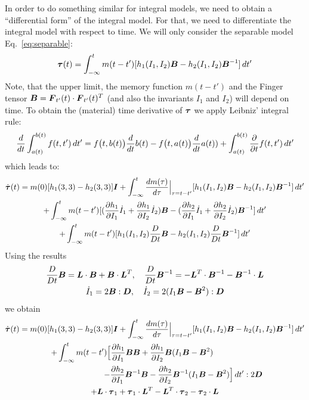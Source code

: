 In order to do something similar for integral models, we need to obtain a ``differential form'' of the integral model. For that, we need to differentiate the integral model with respect to time. We will only consider the separable model Eq.~\eqref{eq:separable}:
\begin{equation}
  \boldsymbol{\tau}(t) = \int_{-\infty}^tm(t-t')[h_1(I_1,I_2)\boldsymbol{B}-h_2(I_1,I_2)\boldsymbol{B}^{-1}]\,dt'
  \label{eq:separable2}
\end{equation}
Note, that the upper limit, the memory function $m(t-t')$ and the Finger tensor $\boldsymbol{B}=\boldsymbol{F}_{t'}(t)\cdot\boldsymbol{F}_{t'}(t)^T$  (and also the invariants $I_1$ and $I_2$) will depend on time. To obtain the (material) time derivative of $\boldsymbol{\tau}$ we apply Leibniz' integral rule:
\begin{equation}
    \dfrac{d }{d t}\int^{b(t)}_{a(t)}f(t,t')\,dt'=f\big(t,b(t)\big)\dfrac{d }{d t}b(t) -f\big(t,a(t)\big)\dfrac{d }{d t}a(t))+\int^{b(t)}_{a(t)}\dfrac{\partial }{\partial t}f(t,t')\,dt'
\end{equation}
which leads to:
\begin{multline}
  \dot{\boldsymbol{\tau}}(t) = m(0)[h_1(3,3)-h_2(3,3)]\boldsymbol{I}
  +\int_{-\infty}^t\dfrac{d m(\tau)}{d \tau}\Big|_{\tau=t-t'}[h_1(I_1,I_2)\boldsymbol{B}-h_2(I_1,I_2)\boldsymbol{B}^{-1}]\,dt'\\
  +\int_{-\infty}^tm(t-t')[(\dfrac{\partial h_1}{\partial I_1}\dot I_1+\dfrac{\partial h_1}{\partial I_2}\dot I_2)\boldsymbol{B}-
            (\dfrac{\partial h_2}{\partial I_1}\dot I_1+\dfrac{\partial h_2}{\partial I_2}\dot I_2)\boldsymbol{B}^{-1}]\,dt'\\
            +\int_{-\infty}^tm(t-t')[h_1(I_1,I_2)\dfrac{D }{D t}\boldsymbol{B}-h_2(I_1,I_2)\dfrac{D }{D t}\boldsymbol{B}^{-1}]\,dt'
  \label{eq:diffseparable}
\end{multline}
Using the results
\begin{gather}
  \dfrac{D }{D t}\boldsymbol{B} = \boldsymbol{L}\cdot \boldsymbol{B}+\boldsymbol{B} \cdot\boldsymbol{L}^T,\quad
    \dfrac{D }{D t}\boldsymbol{B}^{-1} = -\boldsymbol{L}^T\cdot \boldsymbol{B}^{-1}-\boldsymbol{B}^{-1} \cdot\boldsymbol{L}\\
    \dot I_1=2\boldsymbol{B}:\boldsymbol{D},\quad \dot I_2=2(I_1\boldsymbol{B}-\boldsymbol{B}^2):\boldsymbol{D}
\end{gather}
we obtain
\begin{multline}
  \dot{\boldsymbol{\tau}}(t) = m(0)[h_1(3,3)-h_2(3,3)]\boldsymbol{I}
  +\int_{-\infty}^t\dfrac{d m(\tau)}{d \tau}\Big|_{\tau=t-t'}[h_1(I_1,I_2)\boldsymbol{B}-h_2(I_1,I_2)\boldsymbol{B}^{-1}]\,dt'\\
  +\int_{-\infty}^tm(t-t')\Big[\dfrac{\partial h_1}{\partial I_1}\boldsymbol{B}\boldsymbol{B}+\dfrac{\partial h_1}{\partial I_2}\boldsymbol{B}(I_1\boldsymbol{B}-\boldsymbol{B}^2)\hspace*{2cm}\\
  \hspace*{2.5cm}-\dfrac{\partial h_2}{\partial I_1}\boldsymbol{B}^{-1}\boldsymbol{B}-\dfrac{\partial h_2}{\partial I_2}\boldsymbol{B}^{-1}(I_1\boldsymbol{B}-\boldsymbol{B}^2)\Big]\,dt':2\boldsymbol{D}\\
            +\boldsymbol{L}\cdot \boldsymbol{\tau}_1+\boldsymbol{\tau}_1 \cdot\boldsymbol{L}^T
            -\boldsymbol{L}^T\cdot \boldsymbol{\tau}_2-\boldsymbol{\tau}_2\cdot\boldsymbol{L}
  \label{eq:diffseparable2}
\end{multline}
